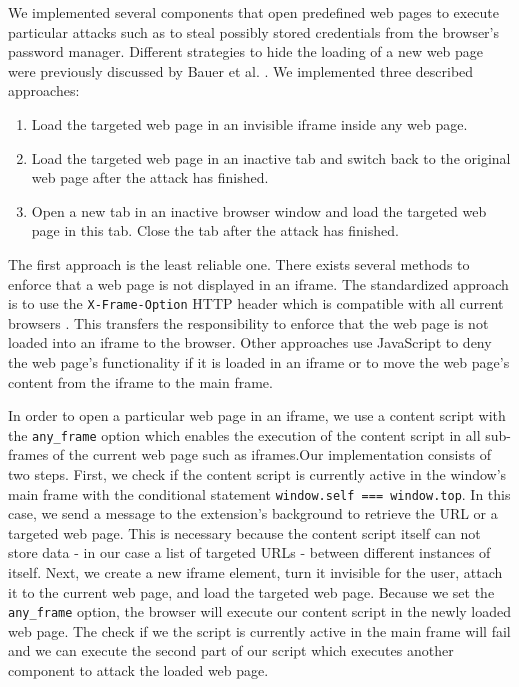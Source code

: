 	We implemented several components that open predefined web pages to execute particular attacks such as to steal possibly stored credentials from the browser's password manager. Different strategies to hide the loading of a new web page were previously discussed by Bauer et al. \cite{extensions:cns14}. We implemented three described approaches:
	
	\begin{enumerate}
		\item Load the targeted web page in an invisible iframe inside any web page.
		\item Load the targeted web page in an inactive tab and switch back to the original web page after the attack has finished.
		\item Open a new tab in an inactive browser window and load the targeted web page in this tab. Close the tab after the attack has finished.
	\end{enumerate} 
	
	The first approach is the least reliable one. There exists several methods to enforce that a web page is not displayed in an iframe. The standardized approach is to use the \texttt{X-Frame-Option} HTTP header which is compatible with all current browsers \cite{xFrameOptionsSpezification, xFrameOptionsCompability}. This transfers the responsibility to enforce that the web page is not loaded into an iframe to the browser. Other approaches use JavaScript to deny the web page's functionality if it is loaded in an iframe or to move the web page's content from the iframe to the main frame.
		
	In order to open a particular web page in an iframe, we use a content script with the \texttt{any\_frame} option which enables the execution of the content script in all sub-frames of the current web page such as iframes.Our implementation consists of two steps. First, we check if the content script is currently active in the window's main frame with the conditional statement \lstinline|window.self === window.top|. In this case, we send a message to the extension's background to retrieve the URL or a targeted web page. This is necessary because the content script itself can not store data - in our case a list of targeted URLs - between different instances of itself. Next, we create a new iframe element, turn it invisible for the user, attach it to the current web page, and load the targeted web page. Because we set the \texttt{any\_frame} option, the browser will execute our content script in the newly loaded web page. The check if we the script is currently active in the main frame will fail and we can execute the second part of our script which executes another component to attack the loaded web page.
	
